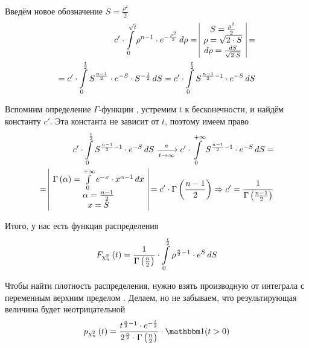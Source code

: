 Введём новое обозначение $S = \frac{\rho^2}{2}$
\begin{align*}
  c' \cdot \integral{0}{\sqrt{t}}{\rho}{
      \rho^{n-1} \cdot e^{- \frac{\rho^2}{2}}}
  = \begin{array}{|c|}
      S = \frac{\rho^2}{2} \\
      \rho = \sqrt{2 \cdot S} \\
      d\rho = \frac{dS}{\sqrt{2 \cdot S}}
  \end{array} = \\
  = c' \cdot \integral{0}{\frac{t}{2}}{S}{
      S^{\frac{n-1}{2}} \cdot e^{-S} \cdot S^{-\frac{1}{2}}}
  = c' \cdot \integral{0}{\frac{t}{2}}{S}{
      S^{\frac{n-1}{2} - 1} \cdot e^{-S}}
\end{align*}

Вспомним определение $\Gamma$-функции \cite[с.~416]{DorogovtsevMA}, устремим
$t$ к бесконечности, и найдём константу $c'$. Эта константа не зависит от
$t$, поэтому имеем право
\begin{align*}
  c' \cdot \integral{0}{\frac{t}{2}}{S}{
      S^{\frac{n-1}{2} - 1} \cdot e^{-S}}
  \covergencen{t}{a}
  c' \cdot \integral{0}{+ \infty}{S}{
      S^{\frac{n-1}{2} - 1} \cdot e^{-S}} = \\
  = \begin{array}{|c|}
      \Gamma\left( \alpha \right)
      = \integral{0}{+ \infty}{x}{e^{-x} \cdot x^{\alpha-1}} \\
      \alpha = \frac{n-1}{2} \\
      x = S
  \end{array}
  = c' \cdot \Gamma\left( \frac{n-1}{2} \right)
  \Rightarrow c' = \frac{1}{\Gamma\left( \frac{n-1}{2} \right)}
\end{align*}

Итого, у нас есть функция распределения
\begin{align*}
  \cdfof{\chi_n^2}{t}
  =  \frac{1}{\Gamma\left( \frac{n}{2} \right)} \cdot
      \integral{0}{\frac{t}{2}}{S}{\rho^{\frac{n}{2}-1} \cdot e^S}
\end{align*}

Чтобы найти плотность распределения, нужно взять производную от интеграла
с переменным верхним пределом \cite[с.~353]{IlinMA1}. Делаем, но не забываем,
что результирующая величина будет неотрицательной
\begin{align*}
  \pdfof{\chi_n^2}{t}
  = \frac{t^{\frac{n}{2}-1} \cdot e^{-\frac{t}{2}}}{
      2^{\frac{n}{2}} \cdot \Gamma\left( \frac{n}{2} \right)}
      \cdot \indicator{t>0}
\end{align*}

